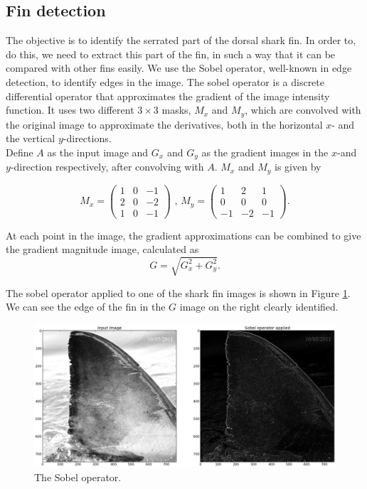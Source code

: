 \documentclass[a4paper,10pt]{article}
\begin{document}
\subsection{Fin detection}
The objective is to identify the serrated part of the dorsal shark fin. In order
to, do this, we need to extract this part of the fin, in such a way that it can be 
compared with other fins easily.
We use the
Sobel operator,
well-known in edge detection, to identify edges in the image.
The sobel operator is a discrete differential operator that approximates the
gradient of the image intensity function.  It uses two different $3 \times 3$
masks, $M_x$ and $M_y$, which are convolved with the original image to
approximate the
derivatives, both in the horizontal $x$-
and the vertical $y$-directions.  \\

Define $A$ as the input image and $G_x$ and $G_y$ as the gradient images in the
$x$-and $y$-direction respectively,
after convolving with $A$.  $M_x$ and $M_y$ is given by

\[
 M_x = \begin{pmatrix*}
        1 & 0 & -1 \\
        2 & 0 & -2 \\
        1 & 0 & -1
       \end{pmatrix*}
\mbox{ , }
 M_y = \begin{pmatrix*}
        1 & 2 & 1 \\
        0 & 0 & 0 \\
        -1 & -2 & -1
       \end{pmatrix*}
.\]

At each point in the image, the gradient approximations can be combined to give
the gradient magnitude image, calculated  as
\[
 G = \sqrt{G_x^2+G_y^2}
.\]

The sobel operator applied to one of the shark fin images is shown in Figure 
\ref{sobel}.
We can see the edge of the fin in the $G$ image on the right clearly
identified.

\begin{figure}[H]
 \centering
 \includegraphics[width=5in]{sobel.jpg}
 \caption{The Sobel operator.}
 \label{sobel}
\end{figure}
\end{document}
